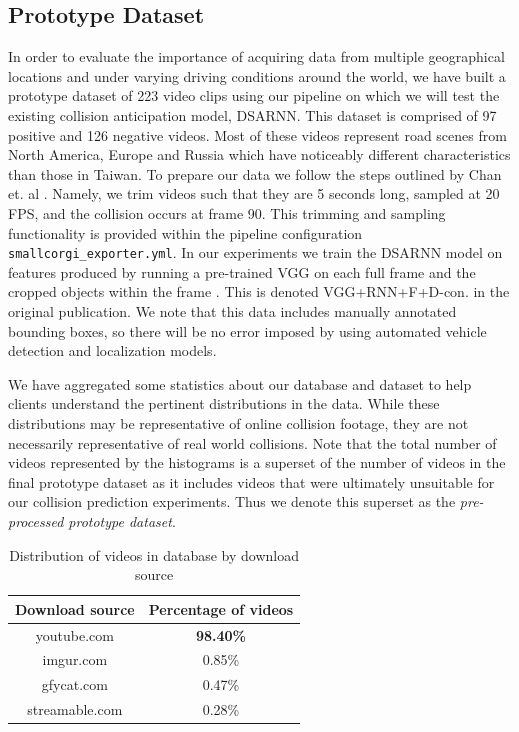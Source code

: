 \documentclass[letterpaper, 10 pt, conference]{ieeeconf}
\begin{document}
\subsection{Prototype Dataset}
\label{section-prototype-dataset}
In order to evaluate the importance of acquiring data from multiple geographical locations and under varying driving conditions around the world, we have built a prototype dataset of 223 video clips using our pipeline on which we will test the existing collision anticipation model, DSARNN. This dataset is comprised of 97 positive and 126 negative videos. Most of these videos represent road scenes from North America, Europe and Russia which have noticeably different characteristics than those in Taiwan. To prepare our data we follow the steps outlined by Chan et. al \cite{chan2016anticipating}. Namely, we trim videos such that they are 5 seconds long, sampled at 20 FPS, and the collision occurs at frame 90. This trimming and sampling functionality is provided within the pipeline configuration \texttt{smallcorgi\_exporter.yml}. In our experiments we train the DSARNN model on features produced by running a pre-trained VGG on each full frame and the cropped objects within the frame \cite{DBLP:journals/corr/SimonyanZ14a}. This is denoted VGG+RNN+F+D-con. in the original publication. We note that this data includes manually annotated bounding boxes, so there will be no error imposed by using automated vehicle detection and localization models.

\byclass
{}\byactors
{}\byagents
{}\byduration

We have aggregated some statistics about our database and dataset to help clients understand the pertinent distributions in the data. While these distributions may be representative of online collision footage, they are not necessarily representative of real world collisions. Note that the total number of videos represented by the histograms is a superset of the number of videos in the final prototype dataset as it includes videos that were ultimately unsuitable for our collision prediction experiments. Thus we denote this superset as the \textit{pre-processed prototype dataset}.

\begin{table}[!h]
	\caption{Distribution of videos in database by download source}
	\label{vids-by-source}
	\begin{center}
		\begin{tabular}{|c|c|}
			\hline
			Download source & Percentage of videos \\
			\hline
			youtube.com & \textbf{98.40\%} \\
			\hline
			imgur.com & 0.85\% \\
			\hline
			gfycat.com & 0.47\% \\
			\hline
			streamable.com & 0.28\% \\
			\hline
		\end{tabular}
	\end{center}
\end{table}
\end{document}
